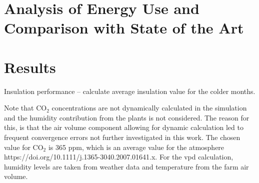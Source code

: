 \section{Analysis of Energy Use and Comparison with State of the Art}
\label{sec:sim-energy-and-comparison}

\section{Results}
\label{sec:simulation-results}
Insulation performance -- calculate average insulation value for the colder months.

Note that $\text{CO}_2$ concentrations are not dynamically calculated in the simulation and the humidity contribution from the plants is not considered.
The reason for this, is that the air volume component allowing for dynamic calculation led to frequent convergence errors not further investigated in this work.
The chosen value for $\text{CO}_2$ is 365 ppm, which is an average value for the atmosphere https://doi.org/10.1111/j.1365-3040.2007.01641.x.
For the \ac{vpd} calculation, humidity levels are taken from weather data and temperature from the farm air volume.

